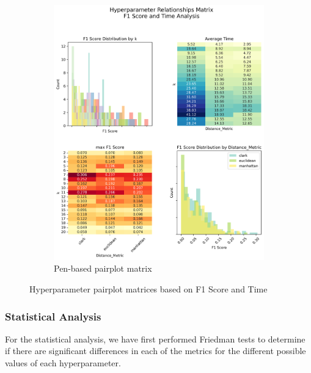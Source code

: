 \begin{figure}[H]
\begin{subfigure}{0.49\textwidth}
        \includegraphics[width=\linewidth]{figures/penbased_hyperparameter_pairplot_matrix.png}
        \caption{Pen-based pairplot matrix}
    \end{subfigure}
    \caption{Hyperparameter pairplot matrices based on F1 Score and Time}
    \label{fig:pairplot}
\end{figure}

\subsubsection{Statistical Analysis}
For the statistical analysis, we have first performed Friedman tests to determine if there are significant differences in each of the metrics for the different possible values of each hyperparameter. 
